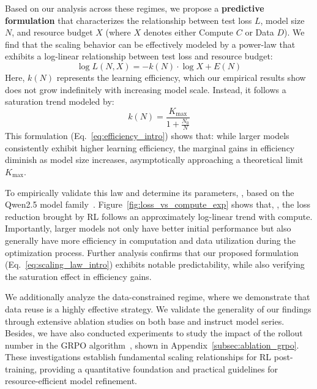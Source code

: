 Based on our analysis across these regimes, we propose a \textbf{predictive formulation} that characterizes the relationship between test loss $L$, model size $N$, and resource budget $X$ (where $X$ denotes either Compute $C$ or Data $D$). We find that the scaling behavior can be effectively modeled by a power-law that exhibits a log-linear relationship between test loss and resource budget:
\begin{equation}
    \label{eq:scaling_law_intro}
    \log L(N, X) = -k(N) \cdot \log X + E(N)
\end{equation}
Here, $k(N)$ represents the learning efficiency, which our empirical results show does not grow indefinitely with increasing model scale. Instead, it follows a saturation trend modeled by:
\begin{equation}
    \label{eq:efficiency_intro}
    k(N) = \frac{K_{\text{max}}}{1 + \frac{N_{0}}{N}}
\end{equation}
This formulation (Eq.~\ref{eq:efficiency_intro}) shows that: while larger models consistently exhibit higher learning efficiency, the marginal gains in efficiency diminish as model size increases, asymptotically approaching a theoretical limit $K_{\text{max}}$.

To empirically validate this law and determine its parameters, , based on the Qwen2.5 model family~\citep{qwen2025qwen25technicalreport}. Figure~\ref{fig:loss_vs_compute_exp} shows that, , the loss reduction brought by RL follows an approximately log-linear trend with compute. Importantly, larger models not only have better initial performance but also generally have more efficiency in computation and data utilization during the optimization process. Further analysis confirms that our proposed formulation (Eq.~\ref{eq:scaling_law_intro}) exhibits notable predictability, while also verifying the saturation effect in efficiency gains.

We additionally analyze the data-constrained regime, where we demonstrate that data reuse is a highly effective strategy. We validate the generality of our findings through extensive ablation studies on both base and instruct model series. Besides, we have also conducted experiments to study the impact of the rollout number in the GRPO algorithm~\citep{shao2024deepseekmathpushinglimitsmathematical}, shown in Appendix~\ref{subsec:ablation_grpo}. These investigations establish fundamental scaling relationships for RL post-training, providing a quantitative foundation and practical guidelines for resource-efficient model refinement.

